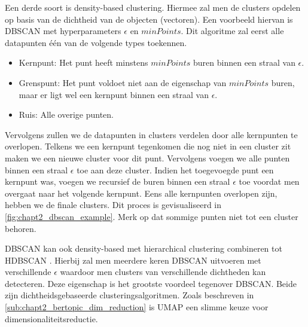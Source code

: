 
Een derde soort is density-based clustering. Hiermee zal men de clusters opdelen op basis van de dichtheid van de objecten (vectoren). Een voorbeeld hiervan is DBSCAN met hyperparameters $\epsilon$ en $minPoints$. Dit algoritme zal eerst alle datapunten één van de volgende types toekennen.

\begin{itemize}
    \item Kernpunt: Het punt heeft minstens $minPoints$ buren binnen een straal van $\epsilon$.
    \item Grenspunt: Het punt voldoet niet aan de eigenschap van $minPoints$ buren, maar er ligt wel een kernpunt binnen een straal van $\epsilon$.
    \item Ruis: Alle overige punten.
\end{itemize}

Vervolgens zullen we de datapunten in clusters verdelen door alle kernpunten te overlopen. Telkens we een kernpunt tegenkomen die nog niet in een cluster zit maken we een nieuwe cluster voor dit punt. Vervolgens voegen we alle punten binnen een straal $\epsilon$ toe aan deze cluster. Indien het toegevoegde punt een kernpunt was, voegen we recursief de buren binnen een straal $\epsilon$ toe voordat men overgaat naar het volgende kernpunt. Eens alle kernpunten overlopen zijn, hebben we de finale clusters. Dit proces is gevisualiseerd in \autoref{fig:chapt2_dbscan_example}. Merk op dat sommige punten niet tot een cluster behoren.


DBSCAN kan ook density-based met hierarchical clustering combineren tot HDBSCAN \cite{hdbscan_paper}. Hierbij zal men meerdere keren DBSCAN uitvoeren met verschillende $\epsilon$ waardoor men clusters van verschillende dichtheden kan detecteren. Deze eigenschap is het grootste voordeel tegenover DBSCAN. 
Beide zijn dichtheidsgebaseerde clusteringsalgoritmen. Zoals beschreven in \autoref{sub:chapt2_bertopic_dim_reduction} is UMAP een slimme keuze voor dimensionaliteitsreductie.

